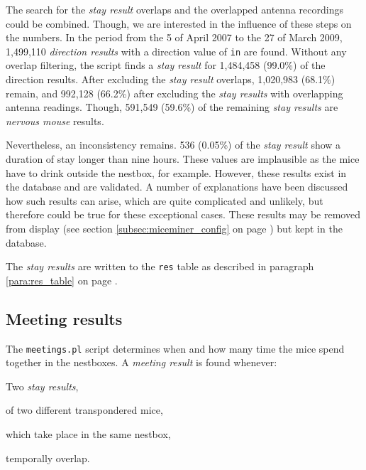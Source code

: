 The search for the \textit{stay result} overlaps and the overlapped antenna recordings could be combined. Though, we are interested in the influence of these steps on the numbers. In the period from the 5 of April 2007 to the 27 of March 2009, 1,499,110 \textit{direction results} with a direction value of \lstinline|in| are found. Without any overlap filtering, the script finds a \textit{stay result} for 1,484,458 (99.0\%) of the direction results. After excluding the \textit{stay result} overlaps, 1,020,983 (68.1\%) remain, and 992,128 (66.2\%) after excluding the \textit{stay results} with overlapping antenna readings. Though, 591,549 (59.6\%) of the remaining \textit{stay results} are \textit{nervous mouse} results.

Nevertheless, an inconsistency remains. 536 (0.05\%) of the \textit{stay result} show a duration of stay longer than nine hours. These values are implausible as the mice have to drink outside the nestbox, for example. However, these results exist in the database and are validated. A number of explanations have been discussed how such results can arise, which are quite complicated and unlikely, but therefore could be true for these exceptional cases. These results may be removed from display (see section \ref{subsec:miceminer_config} on page \pageref{subsec:miceminer_config}) but kept in the database.     

The \textit{stay results} are written to the \lstinline|res| table as described in paragraph \ref{para:res_table} on page \pageref{para:res_table}.

\subsection{Meeting results}
\label{subsec:meetingres}

The \lstinline|meetings.pl| script determines when and how many time the mice spend together in the nestboxes. A \textit{meeting result} is found whenever:

\begin{mylist}
\item Two \textit{stay results}, %
\item of two different transpondered mice, %
\item which take place in the same nestbox,
\item temporally overlap.
\end{mylist}

